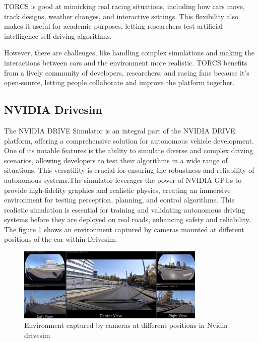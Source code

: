 \documentclass[12pt,twoside,a4paper,parskip]{scrbook} %
\begin{document}
TORCS is good at mimicking real racing situations, including how cars move, track designs, weather changes, and interactive settings. This flexibility also makes it useful for academic purposes, letting researchers test artificial intelligence self-driving algorithms. 

However, there are challenges, like handling complex simulations and making the interactions between cars and the environment more realistic. TORCS benefits from a lively community of developers, researchers, and racing fans because it's open-source, letting people collaborate and improve the platform together.

\subsection{NVIDIA Drivesim}
The NVIDIA DRIVE Simulator is an integral part of the NVIDIA DRIVE platform, offering a comprehensive solution for autonomous vehicle development\cite{nvidia_simulation}. One of its notable features is the ability to simulate diverse and complex driving scenarios, allowing developers to test their algorithms in a wide range of situations. This versatility is crucial for ensuring the robustness and reliability of autonomous systems.The simulator leverages the power of NVIDIA GPUs to provide high-fidelity graphics and realistic physics, creating an immersive environment for testing perception, planning, and control algorithms. This realistic simulation is essential for training and validating autonomous driving systems before they are deployed on real roads, enhancing safety and reliability. The figure \ref{fig:drivesim} shows an environment captured by cameras mounted at different positions of the car within Drivesim.

\begin{figure}[h]
    \centering
    \includegraphics[width=0.8\textwidth]{Images/Nvidia.png}
    \caption{Environment captured by cameras at different positions in Nvidia drivesim}
    \label{fig:drivesim}
  \end{figure}
\end{document}
